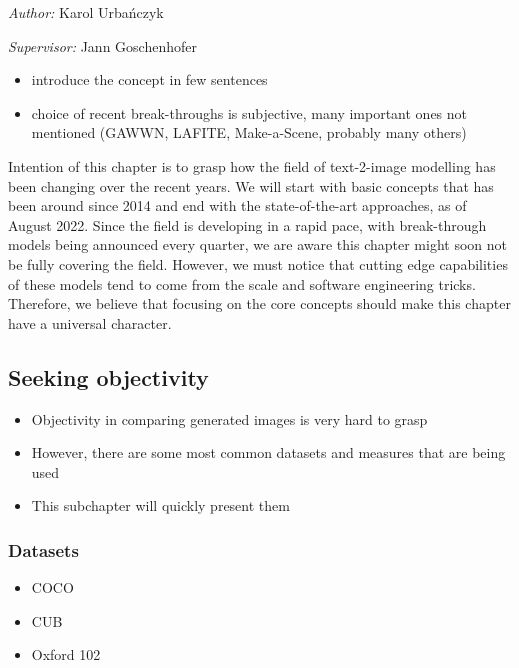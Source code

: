 \documentclass[
]{krantz}
\providecommand{\tightlist}{%
  \setlength{\itemsep}{0pt}\setlength{\parskip}{0pt}}
\begin{document}
\emph{Author:} Karol Urbańczyk

\emph{Supervisor:} Jann Goschenhofer

\begin{itemize}
\tightlist
\item
  introduce the concept in few sentences
\item
  choice of recent break-throughs is subjective, many important ones not mentioned (GAWWN, LAFITE, Make-a-Scene, probably many others)
\end{itemize}

Intention of this chapter is to grasp how the field of text-2-image modelling has been changing over the recent years. We will start with basic concepts that has been around since 2014 and end with the state-of-the-art approaches, as of August 2022. Since the field is developing in a rapid pace, with break-through models being announced every quarter, we are aware this chapter might soon not be fully covering the field. However, we must notice that cutting edge capabilities of these models tend to come from the scale and software engineering tricks. Therefore, we believe that focusing on the core concepts should make this chapter have a universal character.

\hypertarget{seeking-objectivity}{%
\subsection{Seeking objectivity}\label{seeking-objectivity}}

\begin{itemize}
\tightlist
\item
  Objectivity in comparing generated images is very hard to grasp
\item
  However, there are some most common datasets and measures that are being used
\item
  This subchapter will quickly present them
\end{itemize}

\hypertarget{datasets-1}{%
\subsubsection{Datasets}\label{datasets-1}}

\begin{itemize}
\tightlist
\item
  COCO
\item
  CUB
\item
  Oxford 102
\end{itemize}
\end{document}
